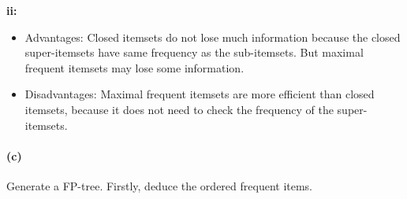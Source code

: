 \documentclass[en,black,normal,10pt]{elegantnote}
\begin{document}
\textbf{ii:}

\begin{itemize}
  \item Advantages: Closed itemsets do not lose much information because the closed super-itemsets have same frequency as the sub-itemsets. But maximal frequent itemsets may lose some information.
  \item Disadvantages: Maximal frequent itemsets are more efficient than closed itemsets, because it does not need to check the frequency of the super-itemsets.
\end{itemize}

\paragraph*{(c)} 

Generate a FP-tree. Firstly, deduce the ordered frequent items.
\end{document}
